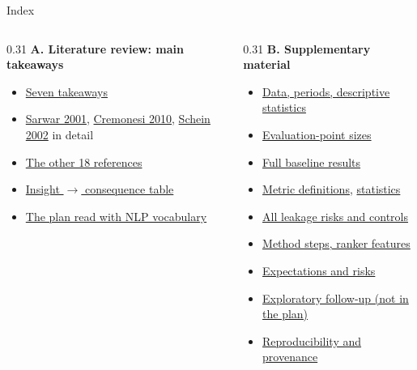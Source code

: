\documentclass[aspectratio=169,10pt]{beamer}
\subtitle{Backup slides: literature takeaways, supplementary material, anticipated questions}
\begin{document}
\maketitle

\begin{frame}[label=index]{Index}
  \footnotesize
  \begin{columns}[T]
    \begin{column}{0.31\textwidth}
      \textbf{A. Literature review: main takeaways}
      \begin{itemize}\setlength{\itemsep}{0pt}
        \item \hyperlink{litsum}{Seven takeaways}
        \item \hyperlink{sarwar}{Sarwar 2001},
              \hyperlink{cremonesi}{Cremonesi 2010},
              \hyperlink{schein}{Schein 2002} in detail
        \item \hyperlink{others}{The other 18 references}
        \item \hyperlink{insights}{Insight $\rightarrow$ consequence table}
        \item \hyperlink{nlp}{The plan read with NLP vocabulary}
      \end{itemize}
    \end{column}
    \begin{column}{0.31\textwidth}
      \textbf{B. Supplementary material}
      \begin{itemize}\setlength{\itemsep}{0pt}
        \item \hyperlink{data}{Data, periods, descriptive statistics}
        \item \hyperlink{points}{Evaluation-point sizes}
        \item \hyperlink{baseline}{Full baseline results}
        \item \hyperlink{metrics}{Metric definitions},
              \hyperlink{stats}{statistics}
        \item \hyperlink{leak}{All leakage risks and controls}
        \item \hyperlink{ranker}{Method steps, ranker features}
        \item \hyperlink{expect}{Expectations and risks}
        \item \hyperlink{explor}{Exploratory follow-up (not in the plan)}
        \item \hyperlink{repro}{Reproducibility and provenance}
      \end{itemize}

\end{column}
\end{columns}
\end{frame}
\end{document}
